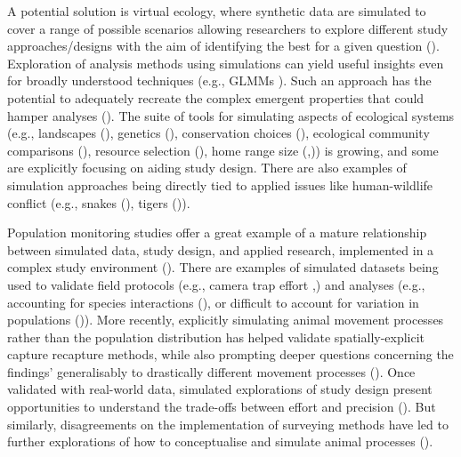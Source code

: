 \documentclass[10pt,a4paper]{article}
\begin{document}
A potential solution is virtual ecology, where synthetic data are simulated to cover a range of possible scenarios allowing researchers to explore different study approaches/designs with the aim of identifying the best for a given question ().
Exploration of analysis methods using simulations can yield useful insights even for broadly understood techniques (e.g., GLMMs ).
Such an approach has the potential to adequately recreate the complex emergent properties that could hamper analyses ().
The suite of tools for simulating aspects of ecological systems (e.g., landscapes (), genetics (), conservation choices (), ecological community comparisons (), resource selection (), home range size (,)) is growing, and some are explicitly focusing on aiding study design.
There are also examples of simulation approaches being directly tied to applied issues like human-wildlife conflict (e.g., snakes (), tigers ()).

Population monitoring studies offer a great example of a mature relationship between simulated data, study design, and applied research, implemented in a complex study environment ().
There are examples of simulated datasets being used to validate field protocols (e.g., camera trap effort ,) and analyses (e.g., accounting for species interactions (), or difficult to account for variation in populations ()).
More recently, explicitly simulating animal movement processes rather than the population distribution has helped validate spatially-explicit capture recapture methods, while also prompting deeper questions concerning the findings' generalisably to drastically different movement processes ().
Once validated with real-world data, simulated explorations of study design present opportunities to understand the trade-offs between effort and precision ().
But similarly, disagreements on the implementation of surveying methods have led to further explorations of how to conceptualise and simulate animal processes ().
\end{document}
